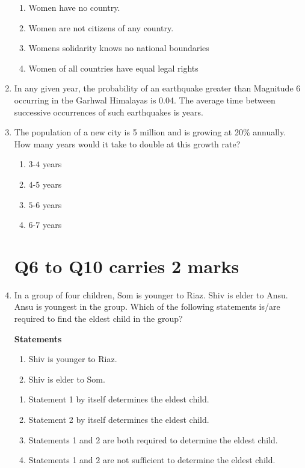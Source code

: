 \documentclass[journal,12pt,onecolumn]{IEEEtran}
\theoremstyle{remark}
\begin{document}
\begin{enumerate}
\hfill{}    
\begin{enumerate}
    \item Women have no country.
    \item Women are not citizens of any country.
    \item Womens solidarity knows no national boundaries
    \item Women of all countries have equal legal rights
\end{enumerate}
\item In any given year, the probability of an earthquake greater than Magnitude 6 occurring in the
Garhwal Himalayas is 0.04. The average time between successive occurrences of such earthquakes
is  \underline{\hspace{3cm}} years.

\hfill{}

\item The population of a new city is 5 million and is growing at 20\% annually. How many years would
it take to double at this growth rate?

\hfill{} 
\begin{multicols}{4}
\begin{enumerate}
\item $3$-$4$ years
\item $4$-$5$ years
\item $5$-$6$ years
\item $6$-$7$ years
\end{enumerate}
\end{multicols}
\section*{Q6 to Q10 carries 2 marks}
\item In a group of four children, Som is younger to Riaz. Shiv is elder to Ansu. Ansu is youngest in the group. Which of the following statements is/are required to find the eldest child in the group?

\textbf{Statements}
\hfill{}
\begin{enumerate}[label=\arabic*]
\item Shiv is younger to Riaz.
\item Shiv is elder to Som.
\end{enumerate}

\begin{enumerate}
    \item Statement 1 by itself determines the eldest child.
    \item Statement 2 by itself determines the eldest child.
    \item Statements 1 and 2 are both required to determine the eldest child.
    \item Statements 1 and 2 are not sufficient to determine the eldest child.
\end{enumerate}


\end{enumerate}
\end{document}
